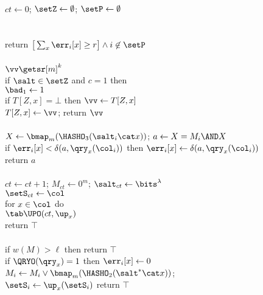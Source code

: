 \begin{figure*}
{
  \vspace{-7pt}
  \hfill{}\\[2pt]
    $ct \gets 0$;
    $\setZ \gets \emptyset$;
    $\setP \gets \emptyset$\\
    \\
    \\
    return $\big[\sum_x \err_i[x] \geq r\big] \wedge i \not\in \setP$
  \\[6pt]
  \\[2pt]
    $\vv \getsr [m]^k$\\
    if $\salt \in \setZ$ and $c = 1$ then \\
    \tab $\bad_1 \gets 1$\\
    if $T[Z,x] = \bot$ then $\vv \gets T[Z,x]$\\
    $T[Z,x] \gets \vv$; return $\vv$
  \\[6pt]
  \\[2pt]
    $X \gets \bmap_m(\HASHO_3(\salt_i \cat x))$;
    $a \gets X = M_i \AND X$\\
    if $\err_i[x] < \delta(a,\qry_x(\col_i))$ then
          $\err_i[x] \gets \delta(a,\qry_x(\col_i))$\\
    return $a$
  \\[6pt]
  \oraclev{$\REPO(\col)$}\hfill {}\\[2pt]
    $ct \gets ct+1$;
    $M_{ct} \gets 0^m$;
    $\salt_{ct} \gets \bits^\lambda$\diffplus{$\setminus \setZ$}\\
    $\setS_{ct} \gets \col$\\
    for $x \in \col$ do\\
    $\tab\UPO(ct, \up_x)$\\
    return $\top$
  \\[6pt]
  \\[2pt]
    if $w(M) > \ell$ then return $\top$\\
    if $\QRYO(\qry_x) = 1$ then $\err_i[x] \gets 0$\\
    $M_i \gets M_i \vee \bmap_m(\HASHO_2(\salt^* \cat x))$;
    $\setS_i \gets \up_x(\setS_i)$
    return $\top$
  \\[6pt]
}
\end{figure*}
